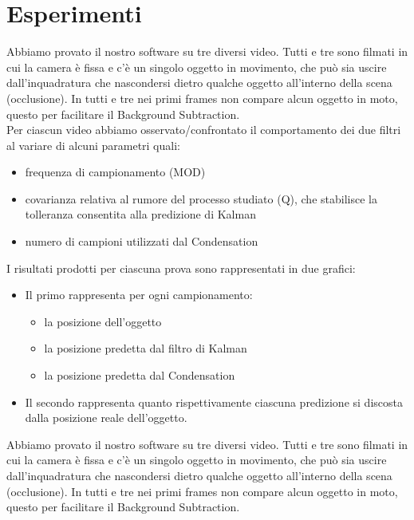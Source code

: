 
\section{Esperimenti}\label{sec:esperimenti}

Abbiamo provato il nostro software su tre diversi video. Tutti e tre sono filmati in cui la camera è fissa e c'è un singolo oggetto in movimento, che può sia uscire dall'inquadratura che nascondersi dietro qualche oggetto all'interno della scena (occlusione). In tutti e tre nei primi frames  non compare alcun oggetto in moto, questo per facilitare il Background Subtraction.\\

Per ciascun video abbiamo osservato/confrontato il comportamento dei due filtri al variare di alcuni parametri quali:
\begin{itemize}
\item frequenza di campionamento (MOD)
\item covarianza relativa al rumore del processo studiato (Q), che stabilisce la tolleranza consentita alla predizione di Kalman
\item numero di campioni utilizzati dal Condensation\\
\end{itemize}

I risultati prodotti per ciascuna prova sono rappresentati in due grafici:
\begin{itemize}
\item Il primo rappresenta per ogni campionamento:
\begin{itemize}
\item la posizione dell'oggetto
\item la posizione predetta dal filtro di Kalman
\item la posizione predetta dal Condensation
\end{itemize}
\item Il secondo rappresenta quanto rispettivamente ciascuna predizione si discosta dalla posizione reale dell'oggetto.
\end{itemize}


Abbiamo provato il nostro software su tre diversi video. Tutti e tre sono filmati in cui la camera è fissa e c'è un singolo oggetto in movimento, che può sia uscire dall'inquadratura che nascondersi dietro qualche oggetto all'interno della scena (occlusione). In tutti e tre nei primi frames  non compare alcun oggetto in moto, questo per facilitare il Background Subtraction.\\

